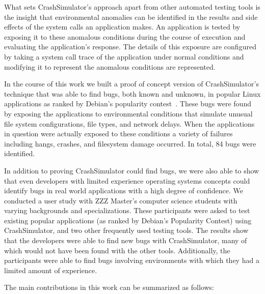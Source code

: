 What sets CrashSimulator's approach apart from other automated testing
tools is the insight that environmental anomalies can be identified
in the results and side effects of the system calls an application makes.
An application is tested by exposing it to these anomalous
conditions during the course of execution and evaluating the application's
response.  The details of this exposure are configured by taking a
system call trace of the application under normal conditions and modifying
it to represent the anomalous conditions are represented.

In the course of this work we built a proof of concept version of
CrashSimulator's technique that was able to find bugs, both known and
unknown, in popular Linux applications as ranked by Debian's popularity
contest~\cite{DebPopCon}.  These bugs were found by exposing the
applications to environmental conditions that simulate unusual file system
configurations, file types, and network delays.  When the applications in
question were actually exposed to these conditions a variety of failures
including hangs, crashes, and filesystem damage occurred.  In total, 84
bugs were identified.

In addition to proving CrashSimulator could find bugs, we were also able to
show that even developers with limited experience operating systems
concepts could identify bugs in real world applications with a high degree
of confidence.
We conducted a user study with
ZZZ Master's computer
science students with varying backgrounds and specializations.  These
participants were asked to test existing popular applications (as ranked by
Debian's Popularity Contest) using CrashSimulator, and two other frequently
used testing tools.
The results show that the developers were able to find new bugs with
CrashSimulator, many of which would not have been found with the other
tools.  Additionally, the
participants were able to find bugs
involving environments with which they had a limited amount of experience.

The main contributions in this work can be summarized as follows:

